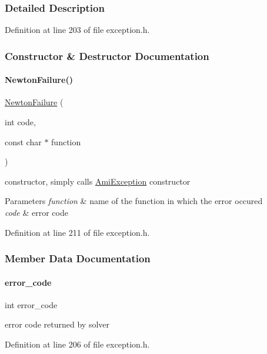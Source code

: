 \subsubsection{Detailed Description}


Definition at line 203 of file exception.\+h.



\subsubsection{Constructor \& Destructor Documentation}
\mbox{\label{classamici_1_1_newton_failure_abb7a5bc514c646f2411344f71c2f7e6f}} 
\paragraph{\texorpdfstring{NewtonFailure()}{NewtonFailure()}}
{\footnotesize\ttfamily \mbox{\hyperlink{classamici_1_1_newton_failure}{Newton\+Failure}} (\begin{DoxyParamCaption}\item[{int}]{code,  }\item[{const char $\ast$}]{function }\end{DoxyParamCaption})}

constructor, simply calls \mbox{\hyperlink{classamici_1_1_ami_exception}{Ami\+Exception}} constructor 
\begin{DoxyParams}{Parameters}
{\em function} & name of the function in which the error occured \\
\hline
{\em code} & error code \\
\hline
\end{DoxyParams}


Definition at line 211 of file exception.\+h.



\subsubsection{Member Data Documentation}
\mbox{\label{classamici_1_1_newton_failure_a7d16b1c68c87cec009d972e79abfba78}} 
\paragraph{\texorpdfstring{error\_code}{error\_code}}
{\footnotesize\ttfamily int error\+\_\+code}

error code returned by solver 

Definition at line 206 of file exception.\+h.

